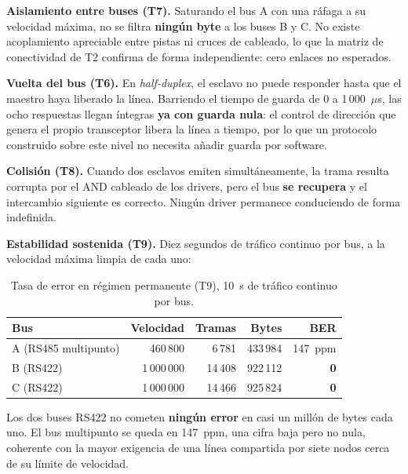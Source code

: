 \textbf{Aislamiento entre buses (T7).} Saturando el bus A con una ráfaga a su velocidad máxima, no se
filtra \textbf{ningún byte} a los buses B y C. No existe acoplamiento apreciable entre pistas ni
cruces de cableado, lo que la matriz de conectividad de T2 confirma de forma independiente: cero
enlaces no esperados.

\textbf{Vuelta del bus (T6).} En \textit{half-duplex}, el esclavo no puede responder hasta que el
maestro haya liberado la línea. Barriendo el tiempo de guarda de 0 a 1\,000~$\mu$s, las ocho
respuestas llegan íntegras \textbf{ya con guarda nula}: el control de dirección que genera el propio
transceptor libera la línea a tiempo, por lo que un protocolo construido sobre este nivel no
necesita añadir guarda por software.

\textbf{Colisión (T8).} Cuando dos esclavos emiten simultáneamente, la trama resulta corrupta por
el AND cableado de los drivers, pero el bus \textbf{se recupera} y el intercambio siguiente es
correcto. Ningún driver permanece conduciendo de forma indefinida.

\textbf{Estabilidad sostenida (T9).} Diez segundos de tráfico continuo por bus, a la velocidad máxima
limpia de cada uno:

\begin{table}[H]
    \centering
    \begin{tabular}{lrrrr}
        \hline
        \textbf{Bus} & \textbf{Velocidad} & \textbf{Tramas} & \textbf{Bytes} & \textbf{BER} \\
        \hline
        A (RS485 multipunto) & 460\,800  & 6\,781  & 433\,984 & 147~ppm \\
        B (RS422)            & 1\,000\,000 & 14\,408 & 922\,112 & \textbf{0} \\
        C (RS422)            & 1\,000\,000 & 14\,466 & 925\,824 & \textbf{0} \\
        \hline
    \end{tabular}
    \caption{Tasa de error en régimen permanente (T9), 10~s de tráfico continuo por bus.}
    \label{tab:pcb_estabilidad}
\end{table}

Los dos buses RS422 no cometen \textbf{ningún error} en casi un millón de bytes cada uno. El bus
multipunto se queda en 147~ppm, una cifra baja pero no nula, coherente con la mayor exigencia de una
línea compartida por siete nodos cerca de su límite de velocidad.

